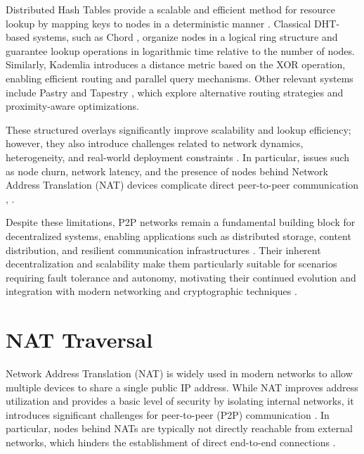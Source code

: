 \documentclass[
  12pt,
  oneside,
  a4paper,
  chapter=TITLE,
  section=TITLE,
  english,
  brazil
]{abntex2}
\begin{document}
Distributed Hash Tables provide a scalable and efficient method for resource lookup by mapping keys to nodes in a deterministic manner \cite{augustine2022byzantine}. Classical DHT-based systems, such as Chord \cite{stoica2001chord}, organize nodes in a logical ring structure and guarantee lookup operations in logarithmic time relative to the number of nodes. Similarly, Kademlia \cite{maymounkov2002kademlia} introduces a distance metric based on the XOR operation, enabling efficient routing and parallel query mechanisms. Other relevant systems include Pastry \cite{rowstron2001pastry} and Tapestry \cite{zhao2001tapestry}, which explore alternative routing strategies and proximity-aware optimizations.

These structured overlays significantly improve scalability and lookup efficiency; however, they also introduce challenges related to network dynamics, heterogeneity, and real-world deployment constraints \cite{augustine2022byzantine}. In particular, issues such as node churn, network latency, and the presence of nodes behind Network Address Translation (NAT) devices complicate direct peer-to-peer communication \cite{li2022unreachable}, \cite{augustine2022byzantine}.

Despite these limitations, P2P networks remain a fundamental building block for decentralized systems, enabling applications such as distributed storage, content distribution, and resilient communication infrastructures \cite{augustine2022byzantine}. Their inherent decentralization and scalability make them particularly suitable for scenarios requiring fault tolerance and autonomy, motivating their continued evolution and integration with modern networking and cryptographic techniques \cite{augustine2022byzantine}.

\section{NAT Traversal}

Network Address Translation (NAT) is widely used in modern networks to allow multiple devices to share a single public IP address. While NAT improves address utilization and provides a basic level of security by isolating internal networks, it introduces significant challenges for peer-to-peer (P2P) communication \cite{li2022unreachable}. In particular, nodes behind NATs are typically not directly reachable from external networks, which hinders the establishment of direct end-to-end connections \cite{li2022unreachable}.
\end{document}
